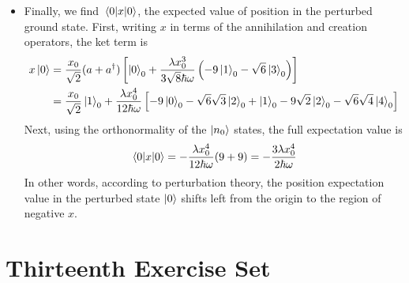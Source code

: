 \documentclass[11pt, a4paper]{article}
\begin{document}
\begin{itemize}
	\item Finally, we find $ \mel{0}{x}{0} $, the expected value of position in the perturbed ground state. First, writing $ x $ in terms of the annihilation and creation operators, the ket term is
	\begin{align*}
		x\ket{0} &= \frac{x_{0}}{\sqrt{2}}(a + a^{\dagger})\left[ \ket{0}_{0} + \frac{\lambda x_{0}^{3}}{3\sqrt{8}\hbar\omega}\left(-9\ket{1}_{0} - \sqrt{6}\ket{3}_{0}\right)\right]\\
		&= \frac{x_{0}}{\sqrt{2}}\ket{1}_{0} + \frac{\lambda x_{0}^{4}}{12\hbar \omega} \left[-9 \ket{0}_{0} - \sqrt{6} \sqrt{3}\ket{2}_{0} + \ket{1}_{0} - 9 \sqrt{2}\ket{2}_{0} - \sqrt{6}\sqrt{4}\ket{4}_{0}\right]
	\end{align*}
	Next, using the orthonormality of the $ \ket{n_{0}} $ states, the full expectation value is
	\begin{equation*}
		\mel{0}{x}{0} = -\frac{\lambda x_{0}^{4}}{12 \hbar \omega}(9 + 9) = -\frac{3\lambda x_{0}^{4}}{2 \hbar \omega}
	\end{equation*}
	In other words, according to perturbation theory, the position expectation value in the perturbed state $ \ket{0} $ shifts left from the origin to the region of negative $ x $. 
	

	
\end{itemize}

\section{Thirteenth Exercise Set}
\end{document}
